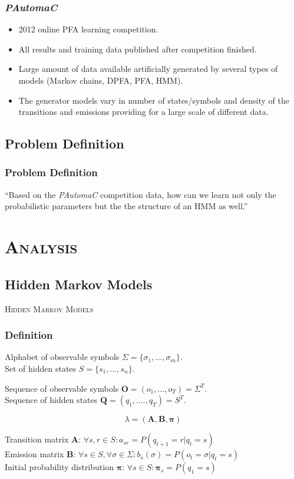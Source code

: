 \begin{frame}
	\frametitle{\emph{PAutomaC}}
	\begin{itemize}
		\item 2012 online PFA learning competition.
		\item All results and training data published after competition finished.
		\item Large amount of data available artificially generated by several types of models (Markov chains, DPFA, PFA, HMM).
		\item The generator models vary in number of states/symbols and density of the transitions and emissions providing for a large scale of different data.
	\end{itemize}
\end{frame}

\subsection{Problem Definition}

\begin{frame}
	\begin{center}
		\frametitle{Problem Definition}
		
		``Based on the \emph{PAutomaC} competition data, how can we learn not only the probabilistic parameters but the the structure of an HMM as well.''
	\end{center}
\end{frame}

\section{\scshape Analysis}
\subsection{Hidden Markov Models}

\begin{frame}
\center \huge \scshape Hidden Markov Models
\end{frame}

\begin{frame}
	\frametitle{Definition}
	
	Alphabet of observable symbols $\Sigma = \{\sigma_1, ..., \sigma_m\}$.\\
	Set of hidden states $S = \{s_1, ..., s_n\}$.
	
	Sequence of observable symbols $\mathbf{O}=(o_1,...,o_T)=\Sigma^T$.\\
	Sequence of hidden states $\mathbf{Q}=(q_1,....,q_T)=S^T$.
	
	$$\lambda=(\mathbf{A},\mathbf{B},\boldsymbol{\pi})$$
	
	Transition matrix $\mathbf{A}$: $\forall s,r\in S: a_{sr}=P(q_{t+1}=r|q_t=s)$\\
	Emission matrix $\mathbf{B}$: $\forall s\in S, \forall \sigma\in\Sigma: b_{s}(\sigma)=P(o_t=\sigma|q_t=s)$\\
	Initial probability distribution $\boldsymbol{\pi}$: $\forall s\in S:\boldsymbol{\pi}_s=P(q_1=s)$
\end{frame}

